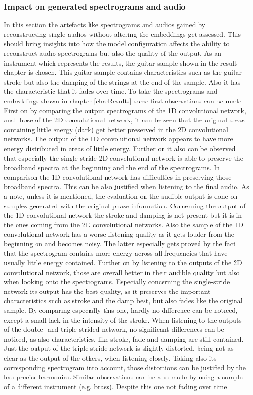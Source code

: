 \subsubsection{Impact on generated spectrograms and audio}
In this section the artefacts like spectrograms and audios gained by reconstructing single audios without altering the embeddings get assessed. This should bring insights into how the model configuration affects the ability to reconstruct audio spectrograms but also the quality of the output. As an instrument which represents the results, the guitar sample shown in the result chapter is chosen. This guitar sample contains characteristics such as the guitar stroke but also the damping of the strings at the end of the sample. Also it has the characteristic that it fades over time. To take the spectrograms and embeddings shown in chapter \ref{cha:Results} some first observations can be made. First on by comparing the output spectrograms of the 1D convolutional network, and those of the 2D convolutional network, it can be seen that the original areas containing little energy (dark) get better preserved in the 2D convolutional networks. The output of the 1D convolutional network appears to have more energy distributed in areas of little energy. Further on it also can be observed that especially the single stride 2D convolutional network is able to preserve the broadband spectra at the beginning and the end of the spectrograms. In comparison the 1D convolutional network has difficulties in preserving those broadband spectra. This can be also justified when listening to the final audio. As a note, unless it is mentioned, the evaluation on the audible output is done on samples generated with the original phase information. Concerning the output of the 1D convolutional network the stroke and damping is not present but it is in the ones coming from the 2D convolutional networks. Also the sample of the 1D convolutional network has a worse listening quality as it gets louder from the beginning on and becomes noisy. The latter especially gets proved by the fact that the spectrogram contains more energy across all frequencies that have usually little energy contained. Further on by listening to the outputs of the 2D convolutional network, those are overall better in their audible quality but also when looking onto the spectrograms. Especially concerning the single-stride network its output has the best quality, as it preserves the important characteristics such as stroke and the damp best, but also fades like the original sample. By comparing especially this one, hardly no difference can be noticed, except a small lack in the intensity of the stroke. When listening to the outputs of the double- and triple-strided network, no significant differences can be noticed, as also characteristics, like stroke, fade and damping are still contained. Just the output of the triple-stride network is slightly distorted, being not as clear as the output of the others, when listening closely. Taking also its corresponding spectrogram into account, those distortions can be justified by the less precise harmonics. Similar observations can be also made by using a sample of a different instrument (e.g. brass). Despite this one not fading over time 